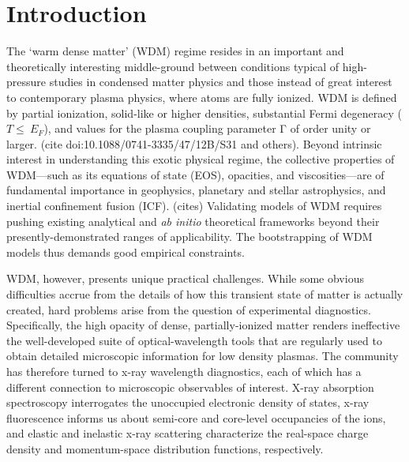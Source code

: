 \section{Introduction}

The `warm dense matter' (WDM) regime resides in an important and
theoretically interesting middle-ground between conditions typical of
high-pressure studies in condensed matter physics and those instead of
great interest to contemporary plasma physics, where atoms are fully
ionized. WDM is defined by partial ionization, solid-like or higher
densities, substantial Fermi degeneracy (\(T \leq \ E_{F}\)), and values
for the plasma coupling parameter Γ of order unity or larger. (cite
doi:10.1088/0741-3335/47/12B/S31 and others). Beyond intrinsic interest
in understanding this exotic physical regime, the collective properties
of WDM---such as its equations of state (EOS), opacities, and
viscosities---are of fundamental importance in geophysics, planetary and
stellar astrophysics, and inertial confinement fusion (ICF). (cites)
Validating models of WDM requires pushing existing analytical and
\emph{ab initio} theoretical frameworks beyond their
presently-demonstrated ranges of applicability. The bootstrapping of WDM
models thus demands good empirical constraints.

WDM, however, presents unique practical challenges. While some obvious
difficulties accrue from the details of how this transient state of
matter is actually created, hard problems arise from the question of
experimental diagnostics. Specifically, the high opacity of dense,
partially-ionized matter renders ineffective the well-developed suite of
optical-wavelength tools that are regularly used to obtain detailed
microscopic information for low density plasmas. The community has
therefore turned to x-ray wavelength diagnostics, each of which has a
different connection to microscopic observables of interest. X-ray
absorption spectroscopy interrogates the unoccupied electronic density
of states, x-ray fluorescence informs us about semi-core and core-level
occupancies of the ions, and elastic and inelastic x-ray scattering
characterize the real-space charge density and momentum-space
distribution functions, respectively.

